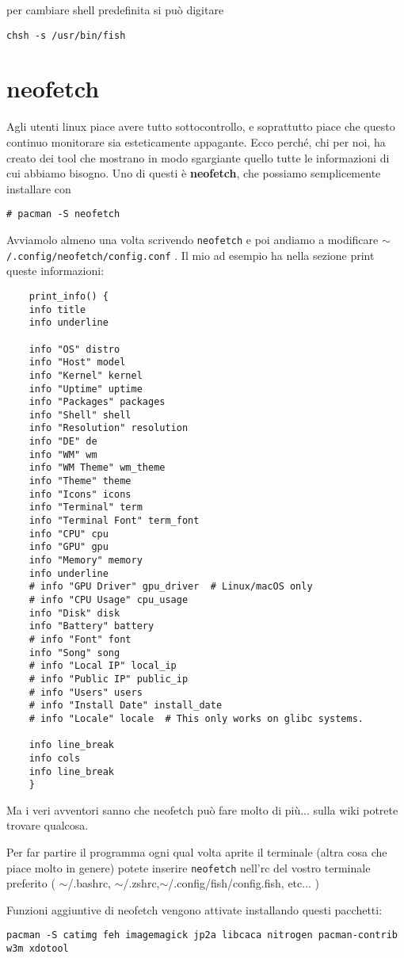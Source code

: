 \documentclass[twoside,italian]{book}
\newcommand{\nlinea}{
	\leavevmode
	\\
}
\newcommand{\centcode}[1]{
	
	\definecolor{centcode}{rgb}{0.5,0.1,0.1}
	
	\begin{center}
	 	\texttt{\textcolor{centcode}{#1}}
	\end{center}
	
	
}
\newcommand{\code}[1]{
	\texttt{\textcolor{code}{#1}}
}
\begin{document}
			per cambiare shell predefinita si può digitare \centcode{chsh -s /usr/bin/fish}
		
		\section{neofetch}
			
			Agli utenti linux piace avere tutto sottocontrollo, e soprattutto piace che questo continuo monitorare sia esteticamente appagante. Ecco perché, chi per noi, ha creato dei tool che mostrano in modo sgargiante quello tutte le informazioni di cui abbiamo bisogno.
			Uno di questi è \textbf{neofetch}, che possiamo semplicemente installare con \centcode{\# pacman -S neofetch}Avviamolo almeno una volta scrivendo \code{neofetch} e poi andiamo a modificare  \code{$\sim$/.config/neofetch/config.conf}. Il mio ad esempio ha nella sezione print queste informazioni:\\
\begin{lstlisting}
	print_info() {
	info title
	info underline
	
	info "OS" distro
	info "Host" model
	info "Kernel" kernel
	info "Uptime" uptime
	info "Packages" packages
	info "Shell" shell
	info "Resolution" resolution
	info "DE" de
	info "WM" wm
	info "WM Theme" wm_theme
	info "Theme" theme
	info "Icons" icons
	info "Terminal" term
	info "Terminal Font" term_font
	info "CPU" cpu
	info "GPU" gpu
	info "Memory" memory
	info underline
	# info "GPU Driver" gpu_driver  # Linux/macOS only
	# info "CPU Usage" cpu_usage
	info "Disk" disk
	info "Battery" battery
	# info "Font" font
	info "Song" song
	# info "Local IP" local_ip
	# info "Public IP" public_ip
	# info "Users" users
	# info "Install Date" install_date
	# info "Locale" locale  # This only works on glibc systems.
	
	info line_break
	info cols
	info line_break
	}
\end{lstlisting}
			Ma i veri avventori sanno che neofetch può fare molto di più... sulla wiki potrete trovare qualcosa.
			
			Per far partire il programma ogni qual volta aprite il terminale (altra cosa che piace molto in genere) potete inserire \code{neofetch} nell'rc del vostro terminale preferito ( $\sim$/.bashrc, $\sim$/.zshrc,$\sim$/.config/fish/config.fish, etc... )
			
			
			Funzioni aggiuntive di neofetch vengono attivate installando questi pacchetti:
			\centcode{pacman -S catimg feh imagemagick jp2a libcaca nitrogen pacman-contrib w3m xdotool}
			\nlinea
			
\end{document}
